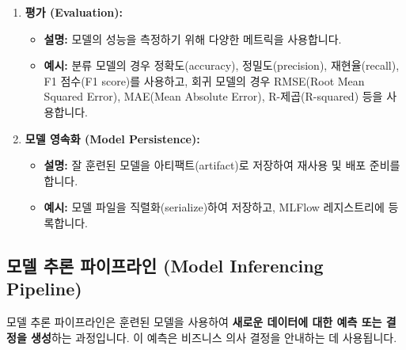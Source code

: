 \documentclass[11pt,a4paper]{article}
\begin{document}
\begin{enumerate}
    \item \textbf{평가 (Evaluation):}
    \begin{itemize}
        \item \textbf{설명:} 모델의 성능을 측정하기 위해 다양한 메트릭을 사용합니다.
        \item \textbf{예시:} 분류 모델의 경우 정확도(accuracy), 정밀도(precision), 재현율(recall), F1 점수(F1 score)를 사용하고, 회귀 모델의 경우 RMSE(Root Mean Squared Error), MAE(Mean Absolute Error), R-제곱(R-squared) 등을 사용합니다.
    \end{itemize}

    \item \textbf{모델 영속화 (Model Persistence):}
    \begin{itemize}
        \item \textbf{설명:} 잘 훈련된 모델을 아티팩트(artifact)로 저장하여 재사용 및 배포 준비를 합니다.
        \item \textbf{예시:} 모델 파일을 직렬화(serialize)하여 저장하고, MLFlow 레지스트리에 등록합니다.
    \end{itemize}
\end{enumerate}

\subsection{모델 추론 파이프라인 (Model Inferencing Pipeline)}

\begin{summarybox}
모델 추론 파이프라인은 훈련된 모델을 사용하여 \textbf{새로운 데이터에 대한 예측 또는 결정을 생성}하는 과정입니다. 이 예측은 비즈니스 의사 결정을 안내하는 데 사용됩니다.
\end{summarybox}
\end{document}

